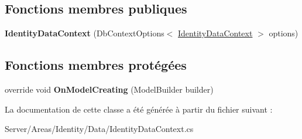 \subsection*{Fonctions membres publiques}
\begin{DoxyCompactItemize}
\item 
\mbox{\label{class_mediwatch_1_1_server_1_1_areas_1_1_identity_1_1_data_1_1_identity_data_context_ace53da6e49b7d2dff2bb67aad43cfa65}} 
{\bfseries Identity\+Data\+Context} (Db\+Context\+Options$<$ \hyperlink{class_mediwatch_1_1_server_1_1_areas_1_1_identity_1_1_data_1_1_identity_data_context}{Identity\+Data\+Context} $>$ options)
\end{DoxyCompactItemize}
\subsection*{Fonctions membres protégées}
\begin{DoxyCompactItemize}
\item 
\mbox{\label{class_mediwatch_1_1_server_1_1_areas_1_1_identity_1_1_data_1_1_identity_data_context_aa038bee1336ce8e66954bc5cfdc52e7a}} 
override void {\bfseries On\+Model\+Creating} (Model\+Builder builder)
\end{DoxyCompactItemize}


La documentation de cette classe a été générée à partir du fichier suivant \+:\begin{DoxyCompactItemize}
\item 
Server/\+Areas/\+Identity/\+Data/Identity\+Data\+Context.\+cs\end{DoxyCompactItemize}
